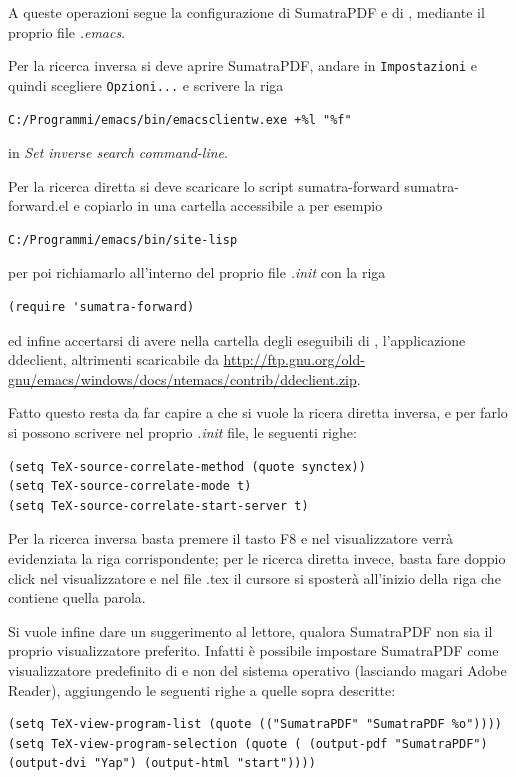 \documentclass[11pt,a4paper]{article}
\begin{document}
A queste operazioni segue la configurazione di SumatraPDF e di \emacs,
mediante il proprio file \emph{.emacs}.

Per la ricerca inversa si deve aprire SumatraPDF, andare in
\texttt{Impostazioni} e quindi scegliere \texttt{Opzioni...} e
scrivere la riga
\begin{Verbatim}
C:/Programmi/emacs/bin/emacsclientw.exe +%l "%f"
\end{Verbatim}
in \emph{Set inverse search command-line}.

Per la ricerca diretta si deve scaricare lo script
sumatra-forward %
{sumatra-forward.el} %
e copiarlo in una cartella accessibile a \emacs{} per esempio
\begin{Verbatim}
C:/Programmi/emacs/bin/site-lisp
\end{Verbatim}
 per poi richiamarlo all'interno del proprio file \emph{.init} con la riga
\begin{Verbatim}
(require 'sumatra-forward)
\end{Verbatim}
ed infine accertarsi di avere nella cartella degli eseguibili di
\emacs, l'applicazione \textsf{ddeclient}, altrimenti scaricabile da %
\url{http://ftp.gnu.org/old-gnu/emacs/windows/docs/ntemacs/contrib/ddeclient.zip}.

Fatto questo resta da far capire a \emacs{} che si vuole la ricera
diretta inversa, e per farlo si possono scrivere nel proprio
\emph{.init} file, le seguenti righe:
\begin{Verbatim}
(setq TeX-source-correlate-method (quote synctex))
(setq TeX-source-correlate-mode t)
(setq TeX-source-correlate-start-server t)
\end{Verbatim}

Per la ricerca inversa basta premere il tasto \textsf{F8} e nel visualizzatore
verrà evidenziata la riga corrispondente; per le ricerca diretta invece, basta
fare doppio click nel visualizzatore e nel file .tex il cursore si sposterà
all'inizio della riga che contiene quella parola.

Si vuole infine dare un suggerimento al lettore, qualora
\textsf{SumatraPDF} non sia il proprio visualizzatore
preferito. Infatti è possibile impostare \textsf{SumatraPDF} come
visualizzatore predefinito di \emacs{} e non del sistema operativo
(lasciando magari \textsf{Adobe Reader}), aggiungendo le seguenti
righe a quelle sopra descritte:
\begin{Verbatim}
(setq TeX-view-program-list (quote (("SumatraPDF" "SumatraPDF %o"))))
(setq TeX-view-program-selection (quote ( (output-pdf "SumatraPDF")
(output-dvi "Yap") (output-html "start"))))
\end{Verbatim}
\end{document}
